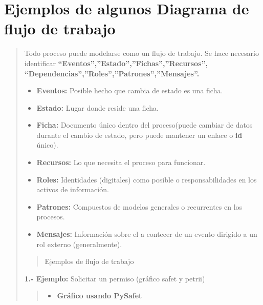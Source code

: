 \documentclass[letterpaper,11pt,spanish]{sphinxmanual}
\begin{document}
\chapter{Ejemplos de algunos Diagrama de flujo de trabajo}
\label{_templates/Contenido1/Introduccion:ejemplos-de-algunos-diagrama-de-flujo-de-trabajo}\begin{quote}

Todo proceso puede modelarse como un flujo de trabajo. Se hace necesario identificar \textbf{``Eventos'',''Estado'',''Fichas'',''Recursos'',} \textbf{``Dependencias'',''Roles'',''Patrones'',''Mensajes''.}
\begin{itemize}
\item {} 
\textbf{Eventos:} Posible hecho que cambia de estado es una ficha.

\item {} 
\textbf{Estado:} Lugar donde reside una ficha.

\item {} 
\textbf{Ficha:} Documento único dentro del proceso(puede cambiar de datos durante el cambio de estado, pero puede mantener un enlace o \textbf{id} único).

\item {} 
\textbf{Recursos:} Lo que necesita el proceso para funcionar.

\item {} 
\textbf{Roles:} Identidades (digitales) como posible o responsabilidades en los activos de información.

\item {} 
\textbf{Patrones:} Compuestos de modelos generales o recurrentes en los procesos.

\item {} 
\textbf{Mensajes:} Información sobre el a contecer de un evento dirigido a un rol externo (generalmente).

\end{itemize}
\begin{quote}\begin{description}
\item[{Ejemplos  de flujo de trabajo}] \leavevmode
\end{description}\end{quote}

\textbf{1.- Ejemplo:} Solicitar un permiso (gráfico safet y petrii)
\begin{quote}
\begin{itemize}
\item {} 
\textbf{Gráfico usando PySafet}


\end{itemize}
\end{quote}
\end{quote}
\end{document}
